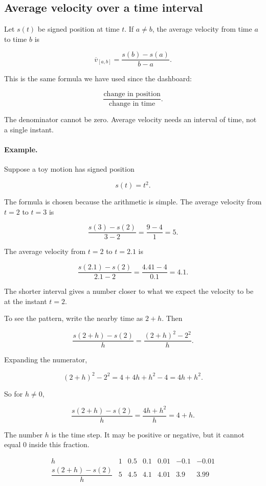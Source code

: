 \subsection{Average velocity over a time interval}

Let \(s(t)\) be signed position at time \(t\). If \(a\neq b\), the average velocity from time \(a\) to time \(b\) is

\[
\overline v_{[a,b]}
=
\frac{s(b)-s(a)}{b-a}.
\]

This is the same formula we have used since the dashboard:

\[
\frac{\text{change in position}}{\text{change in time}}.
\]

The denominator cannot be zero. Average velocity needs an interval of time, not a single instant.

\paragraph{Example.}
Suppose a toy motion has signed position

\[
s(t)=t^2.
\]

The formula is chosen because the arithmetic is simple. The average velocity from \(t=2\) to \(t=3\) is

\[
\frac{s(3)-s(2)}{3-2}
=
\frac{9-4}{1}
=
5.
\]

The average velocity from \(t=2\) to \(t=2.1\) is

\[
\frac{s(2.1)-s(2)}{2.1-2}
=
\frac{4.41-4}{0.1}
=
4.1.
\]

The shorter interval gives a number closer to what we expect the velocity to be at the instant \(t=2\).

To see the pattern, write the nearby time as \(2+h\). Then

\[
\frac{s(2+h)-s(2)}{h}
=
\frac{(2+h)^2-2^2}{h}.
\]

Expanding the numerator,

\[
(2+h)^2-2^2
=
4+4h+h^2-4
=
4h+h^2.
\]

So for \(h\neq 0\),

\[
\frac{s(2+h)-s(2)}{h}
=
\frac{4h+h^2}{h}
=
4+h.
\]

The number \(h\) is the time step. It may be positive or negative, but it cannot equal \(0\) inside this fraction.

\[
\begin{array}{c|rrrrrr}
h & 1 & 0.5 & 0.1 & 0.01 & -0.1 & -0.01 \\ \hline
\dfrac{s(2+h)-s(2)}{h}
& 5 & 4.5 & 4.1 & 4.01 & 3.9 & 3.99
\end{array}
\]

